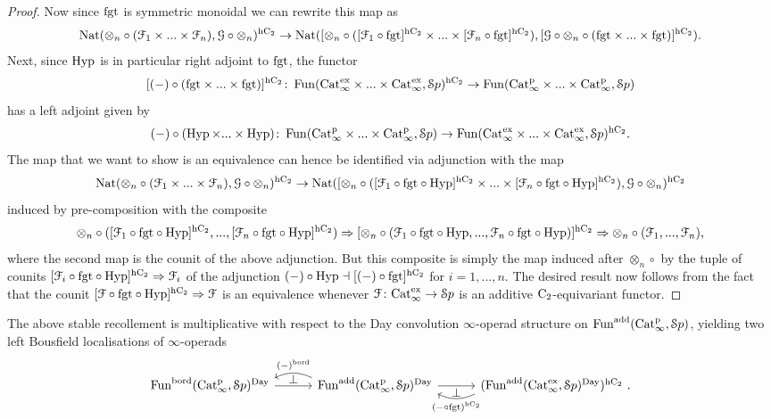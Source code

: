 \begin{proof}
Now since $\fgt$ is symmetric monoidal we can rewrite this map as
\[
\Nat(\otimes_n \circ (\F_1 \times ... \times \F_n),\G \circ \otimes_n)^{\hC} \to \Nat([\otimes_n \circ ([\F_1 \circ \fgt]^{\hC} \times ... \times [\F_n \circ \fgt]^{\hC}),[\G \circ \otimes_n\circ (\fgt \times ... \times \fgt)]^{\hC}) .
\]
Next, since $\Hyp$ is in particular right adjoint to $\fgt$, the functor 
\[
[(-) \circ (\fgt \times ... \times \fgt)]^{\hC}\colon \Fun(\Catx \times ... \times \Catx,\Spa)^{\hC} \to \Fun(\Catp \times ... \times \Catp,\Spa)
\]
has a left adjoint given by
\[
(-) \circ (\Hyp \times ... \times \Hyp)\colon \Fun(\Catp \times ... \times \Catp,\Spa) \to \Fun(\Catx \times ... \times \Catx,\Spa)^{\hC}.
\]
The map that we want to show is an equivalence can hence be identified via adjunction with the map
\[
\Nat(\otimes_n \circ (\F_1 \times ... \times \F_n),\G \circ \otimes_n)^{\hC} \to \Nat([\otimes_n \circ ([\F_1 \circ \fgt \circ \Hyp]^{\hC} \times ... \times [\F_n \circ \fgt \circ \Hyp]^{\hC}),\G \circ \otimes_n)^{\hC}
\]
induced by pre-composition with the composite 
\[
\otimes_n\circ ([\F_1 \circ \fgt\circ \Hyp]^{\hC},...,[\F_n \circ \fgt \circ \Hyp]^{\hC}) \Rightarrow [\otimes_n\circ (\F_1 \circ \fgt\circ \Hyp,...,\F_n \circ \fgt \circ \Hyp)]^{\hC} \Rightarrow   \otimes_n\circ (\F_1,...,\F_n) ,
\]
where the second map is the counit of the above adjunction. But this composite is simply the map induced after $\otimes_n \circ$ by the tuple of counits $[\F_i \circ \fgt \circ \Hyp]^{\hC} \Rightarrow \F_i$
of the adjunction $(-)\circ \Hyp\dashv [(-)\circ \fgt]^{\hC}$ for $i=1,...,n$. The desired result now follows from the fact that the counit $[\F \circ \fgt \circ \Hyp]^{\hC} \Rightarrow \F$ is an equivalence whenever $\F \colon \Catx \to \Spa$ is an additive $\Ct$-equivariant functor.
\end{proof}




\begin{proposition}
The above stable recollement is multiplicative with respect to the Day convolution $\infty$-operad structure on $\Funadd(\Catp,\Spa)$, yielding two left Bousfield localisations of $\infty$-operads
\[
\begin{tikzcd}
[column sep=7ex]
\Funbord(\Catp,\Spa)^{\Day} \ar[r] & 
\Funadd(\Catp,\Spa)^{\Day} 
\ar[r]  
\ar[l,bend right=25,shift right=1.5ex,start anchor=west,end anchor=east,"(-)^{\bord}"'] 
\ar[l,phantom,shift right=1.3ex,start anchor=west,end anchor=east,"\perp"]
& (\Funadd(\Catx,\Spa)^{\Day})^\hC \ .
\ar[l,bend left=25,shift left=1.5ex,start anchor=west,end anchor=east,"{(- \circ \fgt)^\hC}"] 
\ar[l,phantom,shift left=1.2ex,start anchor=west,end anchor=east,"\perp"] 
\end{tikzcd}
\]
\end{proposition}

